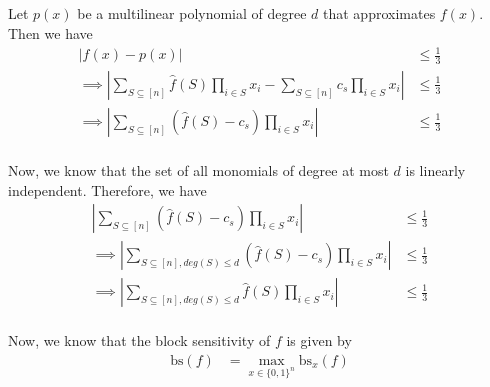 \documentclass{article}
\begin{document}
\subsection{}
\vspace*{-8mm}

Let $p(x)$ be a multilinear polynomial of degree $d$ that approximates $f(x)$. Then we have
\begin{align*}
	|f(x) - p(x)| &\leq \frac{1}{3} \\
	\implies \left|\sum_{S \subseteq [n]} \widehat{f}(S) \prod_{i \in S} x_i - \sum_{S \subseteq [n]} c_s \prod_{i \in S} x_i \right| &\leq \frac{1}{3} \\
	\implies \left|\sum_{S \subseteq [n]} (\widehat{f}(S) - c_s) \prod_{i \in S} x_i \right| &\leq \frac{1}{3} \\
\end{align*}

\noindent
Now, we know that the set of all monomials of degree at most $d$ is linearly independent. Therefore, we have
\begin{align*}
	\left|\sum_{S \subseteq [n]} (\widehat{f}(S) - c_s) \prod_{i \in S} x_i \right| &\leq \frac{1}{3} \\
	\implies \left|\sum_{S \subseteq [n], deg(S) \leq d} (\widehat{f}(S) - c_s) \prod_{i \in S} x_i \right| &\leq \frac{1}{3} \\
	\implies \left|\sum_{S \subseteq [n], deg(S) \leq d} \widehat{f}(S) \prod_{i \in S} x_i \right| &\leq \frac{1}{3} \\
\end{align*}

\noindent
Now, we know that the block sensitivity of $f$ is given by
\begin{align*}
	\text{bs}(f) &= \max_{x \in \{0, 1\}^n} \text{bs}_x(f) \\
\end{align*}
\end{document}
